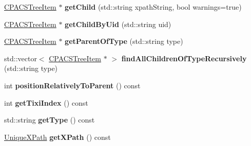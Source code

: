 \begin{DoxyCompactItemize}
\item 
\hypertarget{classcpcr_1_1CPACSTreeItem_aa9fbcf6e10cefae76c8fdfb19dffc799}{\hyperlink{classcpcr_1_1CPACSTreeItem}{C\-P\-A\-C\-S\-Tree\-Item} $\ast$ {\bfseries get\-Child} (std\-::string xpath\-String, bool warnings=true)}\label{classcpcr_1_1CPACSTreeItem_aa9fbcf6e10cefae76c8fdfb19dffc799}

\item 
\hypertarget{classcpcr_1_1CPACSTreeItem_a7931a73f635081bcaf426fe5c902b45c}{\hyperlink{classcpcr_1_1CPACSTreeItem}{C\-P\-A\-C\-S\-Tree\-Item} $\ast$ {\bfseries get\-Child\-By\-Uid} (std\-::string uid)}\label{classcpcr_1_1CPACSTreeItem_a7931a73f635081bcaf426fe5c902b45c}

\item 
\hypertarget{classcpcr_1_1CPACSTreeItem_aeb542c6aff436a873b9399762a33a651}{\hyperlink{classcpcr_1_1CPACSTreeItem}{C\-P\-A\-C\-S\-Tree\-Item} $\ast$ {\bfseries get\-Parent\-Of\-Type} (std\-::string type)}\label{classcpcr_1_1CPACSTreeItem_aeb542c6aff436a873b9399762a33a651}

\item 
\hypertarget{classcpcr_1_1CPACSTreeItem_ad9bc07d8d0cb9b9a4b77a094c33c9954}{std\-::vector$<$ \hyperlink{classcpcr_1_1CPACSTreeItem}{C\-P\-A\-C\-S\-Tree\-Item} $\ast$ $>$ {\bfseries find\-All\-Children\-Of\-Type\-Recursively} (std\-::string type)}\label{classcpcr_1_1CPACSTreeItem_ad9bc07d8d0cb9b9a4b77a094c33c9954}

\item 
\hypertarget{classcpcr_1_1CPACSTreeItem_acaeb3cb39adec3b66ad3cc4bdd1cffcc}{int {\bfseries position\-Relatively\-To\-Parent} () const }\label{classcpcr_1_1CPACSTreeItem_acaeb3cb39adec3b66ad3cc4bdd1cffcc}

\item 
\hypertarget{classcpcr_1_1CPACSTreeItem_a1aee0b7768a02dfdbf1aec4c5fe41efd}{int {\bfseries get\-Tixi\-Index} () const }\label{classcpcr_1_1CPACSTreeItem_a1aee0b7768a02dfdbf1aec4c5fe41efd}

\item 
\hypertarget{classcpcr_1_1CPACSTreeItem_a9a38c858bae35fb8f762e6341bff4437}{std\-::string {\bfseries get\-Type} () const }\label{classcpcr_1_1CPACSTreeItem_a9a38c858bae35fb8f762e6341bff4437}

\item 
\hypertarget{classcpcr_1_1CPACSTreeItem_a1095a4892526237b54df1c9cfa86211c}{\hyperlink{classcpcr_1_1UniqueXPath}{Unique\-X\-Path} {\bfseries get\-X\-Path} () const }\label{classcpcr_1_1CPACSTreeItem_a1095a4892526237b54df1c9cfa86211c}


\end{DoxyCompactItemize}
